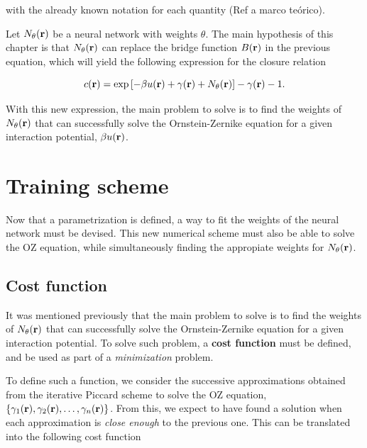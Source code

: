 with the already known notation for each quantity (Ref a marco teórico).

Let $N_{\theta}(\mathbf{r})$ be a neural network with weights $\theta$. The main hypothesis
of this chapter is that $N_{\theta}(\mathbf{r})$ can replace the bridge function $B(\mathbf{r})$
in the previous equation, which will yield the following expression for
the closure relation

\begin{equation}
    c(\mathbf{r}) = \exp{\left[
            -  \beta u(\mathbf{r})
            +  \gamma(\mathbf{r})
            + N_{\theta}(\mathbf{r})\right]} -
    \gamma(\mathbf{r})
    - 1 .
    \label{eq:parametrizacion}
\end{equation}

With this new expression, the main problem to solve is to find the weights
of $N_{\theta}(\mathbf{r})$ that can successfully solve the Ornstein-Zernike equation
for a given interaction potential, $\beta u(\mathbf{r})$.


\section{Training scheme}
Now that a parametrization is defined, a way to fit the weights of the neural network must
be devised. This new numerical scheme must also be able to solve the OZ equation, while
simultaneously finding the appropiate weights for $N_{\theta}(\mathbf{r})$.

\subsection{Cost function}
It was mentioned previously that the main problem to solve is to find the weights of
$N_{\theta}(\mathbf{r})$ that can successfully solve the Ornstein-Zernike equation
for a given interaction potential.
To solve such problem, a \textbf{cost function} must be defined, and be used as part of
a \emph{minimization} problem.

To define such a function, we consider the successive approximations obtained from the
iterative Piccard scheme to solve the OZ equation, $\{\gamma_1(\mathbf{r}), \gamma_2(\mathbf{r}), \dots, \gamma_n(\mathbf{r})\}$.
From this, we expect to have found a solution when each approximation
is \emph{close enough} to the previous one. This can be translated into the following
cost function

